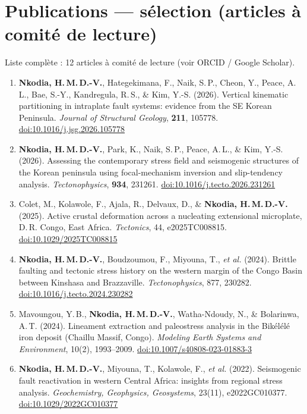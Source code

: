 \documentclass[10.5pt,a4paper]{article}
\begin{document}
\section{Publications — sélection (articles à comité de lecture)}
{\small\color{grey}Liste complète : 12 articles à comité de lecture (voir ORCID / Google Scholar).}
\begin{enumerate}[leftmargin=1.5em, itemsep=2pt, topsep=2pt, label=\arabic*.]
\item \textbf{Nkodia, H.\,M.\,D.-V.}, Hategekimana, F., Naik, S.\,P., Cheon, Y., Peace, A.\,L., Bae, S.-Y., Kandregula, R.\,S., \& Kim, Y.-S. (2026). Vertical kinematic partitioning in intraplate fault systems: evidence from the SE Korean Peninsula. \emph{Journal of Structural Geology}, \textbf{211}, 105778. \href{https://doi.org/10.1016/j.jsg.2026.105778}{doi:10.1016/j.jsg.2026.105778}
\item \textbf{Nkodia, H.\,M.\,D.-V.}, Park, K., Naik, S.\,P., Peace, A.\,L., \& Kim, Y.-S. (2026). Assessing the contemporary stress field and seismogenic structures of the Korean peninsula using focal-mechanism inversion and slip-tendency analysis. \emph{Tectonophysics}, \textbf{934}, 231261. \href{https://doi.org/10.1016/j.tecto.2026.231261}{doi:10.1016/j.tecto.2026.231261}
\item Colet, M., Kolawole, F., Ajala, R., Delvaux, D., \& \textbf{Nkodia, H.\,M.\,D.-V.} (2025). Active crustal deformation across a nucleating extensional microplate, D.\,R. Congo, East Africa. \emph{Tectonics}, 44, e2025TC008815. \href{https://doi.org/10.1029/2025TC008815}{doi:10.1029/2025TC008815}
\item \textbf{Nkodia, H.\,M.\,D.-V.}, Boudzoumou, F., Miyouna, T., \emph{et al.} (2024). Brittle faulting and tectonic stress history on the western margin of the Congo Basin between Kinshasa and Brazzaville. \emph{Tectonophysics}, 877, 230282. \href{https://doi.org/10.1016/j.tecto.2024.230282}{doi:10.1016/j.tecto.2024.230282}
\item Mavoungou, Y.\,B., \textbf{Nkodia, H.\,M.\,D.-V.}, Watha-Ndoudy, N., \& Bolarinwa, A.\,T. (2024). Lineament extraction and paleostress analysis in the Bikélélé iron deposit (Chaillu Massif, Congo). \emph{Modeling Earth Systems and Environment}, 10(2), 1993–2009. \href{https://doi.org/10.1007/s40808-023-01883-3}{doi:10.1007/s40808-023-01883-3}
\item \textbf{Nkodia, H.\,M.\,D.-V.}, Miyouna, T., Kolawole, F., \emph{et al.} (2022). Seismogenic fault reactivation in western Central Africa: insights from regional stress analysis. \emph{Geochemistry, Geophysics, Geosystems}, 23(11), e2022GC010377. \href{https://doi.org/10.1029/2022GC010377}{doi:10.1029/2022GC010377}

\end{enumerate}
\end{document}
